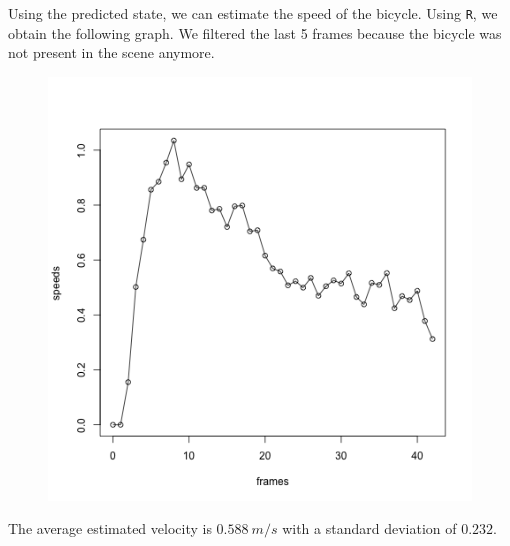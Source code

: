 \documentclass[a4paper,11pt]{article}
\begin{document}
Using the predicted state, we can estimate the speed of the bicycle. Using
\texttt{R}, we obtain the following graph. We filtered the last 5 frames because
the bicycle was not present in the scene anymore.

\begin{figure}[H]
    \centering
    \includegraphics[scale=0.5]{pic/speed_estimation.png}
\end{figure}

The average estimated velocity is $ 0.588~m / s $ with a standard deviation of $ 0.232 $.

\end{document}
